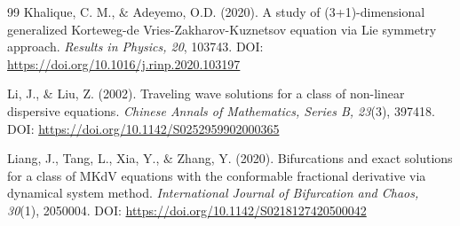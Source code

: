 \documentclass[10pt]{NSP1}
\numberwithin{equation}{section}
\begin{document}
\begin{thebibliography}{99}
 Khalique, C. M., ${\&}$ Adeyemo, O.D. (2020). A study of (3+1)-dimensional generalized Korteweg-de Vries-Zakharov-Kuznetsov equation via Lie symmetry approach. \emph{Results in Physics, 20}, 103743. DOI: \url{https://doi.org/10.1016/j.rinp.2020.103197}

 Li, J., ${\&}$ Liu, Z. (2002). Traveling wave solutions for a class of non-linear dispersive equations. \emph{Chinese Annals of Mathematics, Series B, 23}(3), 397418. DOI: \url{https://doi.org/10.1142/S0252959902000365}

 Liang, J., Tang, L., Xia, Y., ${\&}$ Zhang, Y. (2020). Bifurcations and exact solutions for a class of MKdV equations with the conformable fractional derivative via dynamical system method. \emph{International Journal of Bifurcation and Chaos, 30}(1), 2050004. DOI: \url{https://doi.org/10.1142/S0218127420500042}

\end{thebibliography}
\end{document}
